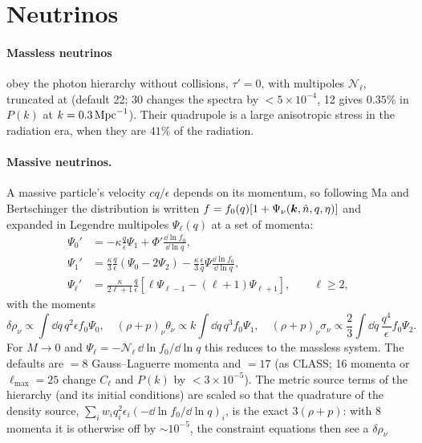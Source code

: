 \section{Neutrinos}

\paragraph*{Massless neutrinos} obey the photon hierarchy without collisions, $\tau'=0$, with multipoles
$\mathcal N_\ell$, truncated at  (default 22; 30 changes the spectra by $<5\times10^{-4}$, 12 gives
$0.35\%$ in $P(k)$ at $k=0.3\,\mathrm{Mpc}^{-1}$). Their quadrupole is a large anisotropic stress in the radiation era, when they
are $41\%$ of the radiation.

\paragraph*{Massive neutrinos.} A massive particle's velocity $cq/\epsilon$ depends on its momentum, so following
Ma and Bertschinger \cite{Ma1995} the distribution is written $f=f_0(q)[1+\Psi_\nu(\bm{k},\hat n,q,\eta)]$ and expanded
in Legendre multipoles $\Psi_\ell(q)$ at a set of momenta:
\begin{align}
\Psi_0'&=-\kappa\frac q\epsilon\Psi_1+\Phi'\frac{\dd\ln f_0}{\dd\ln q},\\
\Psi_1'&=\frac\kappa3\frac q\epsilon(\Psi_0-2\Psi_2)-\frac\kappa3\frac\epsilon q\Psi\frac{\dd\ln f_0}{\dd\ln q},\\
\Psi_\ell'&=\frac{\kappa}{2\ell+1}\frac q\epsilon\left[\ell\Psi_{\ell-1}-(\ell+1)\Psi_{\ell+1}\right],\qquad\ell\ge2,
\end{align}
with the moments
\begin{equation}
\delta\rho_\nu\propto\int\dd q\,q^2\epsilon f_0\Psi_0,\quad
(\rho+p)_\nu\theta_\nu\propto k\int\dd q\,q^3f_0\Psi_1,\quad
(\rho+p)_\nu\sigma_\nu\propto\frac23\int\dd q\,\frac{q^4}{\epsilon}f_0\Psi_2 .
\end{equation}
For $M\to0$ and $\Psi_\ell=-\mathcal N_\ell\,\dd\ln f_0/\dd\ln q$ this reduces to the massless system. The defaults are
 $=8$ Gauss--Laguerre momenta and  $=17$ (as CLASS; 16 momenta or $\ell_{\max}=25$
change $C_\ell$ and $P(k)$ by $<3\times10^{-5}$). The metric source terms of the hierarchy (and its initial conditions)
are scaled so that the quadrature of the density source, $\sum_iw_iq_i^2\epsilon_i(-\dd\ln f_0/\dd\ln q)_i$, is the exact
$3(\rho+p)$: with 8 momenta it is otherwise off by $\sim10^{-5}$, the constraint equations then see a $\delta\rho_\nu$
